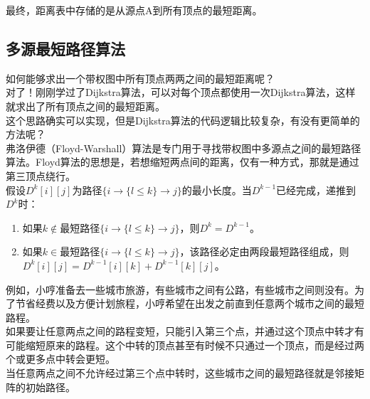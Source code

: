 最终，距离表中存储的是从源点A到所有顶点的最短距离。

\subsection{多源最短路径算法}

如何能够求出一个带权图中所有顶点两两之间的最短距离呢？ \\

对了！刚刚学过了Dijkstra算法，可以对每个顶点都使用一次Dijkstra算法，这样就求出了所有顶点之间的最短距离。 \\

这个思路确实可以实现，但是Dijkstra算法的代码逻辑比较复杂，有没有更简单的方法呢？ \\

弗洛伊德（Floyd-Warshall）算法是专门用于寻找带权图中多源点之间的最短路径算法。Floyd算法的思想是，若想缩短两点间的距离，仅有一种方式，那就是通过第三顶点绕行。 \\

假设$ D^k[i][j] $为路径$ \{i \rightarrow \{l \le k\} \rightarrow j\} $的最小长度。当$ D^{k-1} $已经完成，递推到$ D^k $时：

\begin{enumerate}
    \item 如果$ k \notin \text{最短路径}\{i \rightarrow \{l \le k\} \rightarrow j\} $，则$ D^k = D^{k-1} $。
    \item 如果$ k \in \text{最短路径}\{i \rightarrow \{l \le k\} \rightarrow j\} $，该路径必定由两段最短路径组成，则$ D^k[i][j] = D^{k-1}[i][k] + D^{k-1}[k][j] $。
\end{enumerate}

例如，小哼准备去一些城市旅游，有些城市之间有公路，有些城市之间则没有。为了节省经费以及方便计划旅程，小哼希望在出发之前直到任意两个城市之间的最短路程。 \\

如果要让任意两点之间的路程变短，只能引入第三个点，并通过这个顶点中转才有可能缩短原来的路程。这个中转的顶点甚至有时候不只通过一个顶点，而是经过两个或更多点中转会更短。 \\

当任意两点之间不允许经过第三个点中转时，这些城市之间的最短路径就是邻接矩阵的初始路径。 \\

